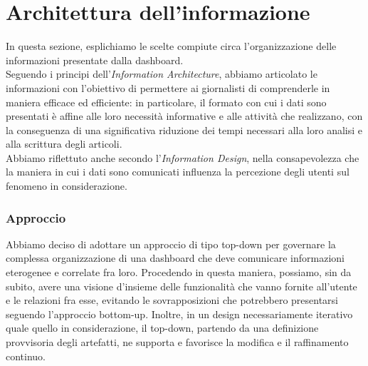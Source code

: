 \section{Architettura dell'informazione}

In questa sezione, esplichiamo le scelte compiute circa l'organizzazione delle informazioni presentate dalla dashboard.\\
Seguendo i principi dell'\textit{Information Architecture}, abbiamo articolato le informazioni con l'obiettivo di permettere ai giornalisti di comprenderle in maniera efficace ed efficiente: in particolare, il formato con cui i dati sono presentati è affine alle loro necessità informative e alle attività che realizzano, con la conseguenza di una significativa riduzione dei tempi necessari alla loro analisi e alla scrittura degli articoli.\\
\noindent
Abbiamo riflettuto anche secondo l'\textit{Information Design}, nella consapevolezza che la maniera in cui i dati sono comunicati influenza la percezione degli utenti sul fenomeno in considerazione.

\subsubsection{Approccio}
Abbiamo deciso di adottare un approccio di tipo top-down per governare la complessa organizzazione di una dashboard che deve comunicare informazioni eterogenee e correlate fra loro.
Procedendo in questa maniera, possiamo, sin da subito, avere una visione d'insieme delle funzionalità che vanno fornite all'utente e le relazioni fra esse, evitando le sovrapposizioni che potrebbero presentarsi seguendo l'approccio bottom-up.
Inoltre, in un design necessariamente iterativo quale quello in considerazione, il top-down, partendo da una definizione provvisoria degli artefatti, ne supporta e favorisce la modifica e il raffinamento continuo.

